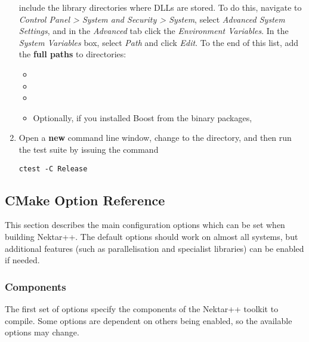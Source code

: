 \begin{enumerate}
  include the library directories where DLLs are stored. To do this, navigate to
  \emph{Control Panel > System and Security > System}, select \emph{Advanced
    System Settings}, and in the \emph{Advanced} tab click the \emph{Environment
    Variables}. In the \emph{System Variables} box, select \emph{Path} and click
  \emph{Edit}. To the end of this list, add the \textbf{full paths} to
  directories:
  \begin{itemize}
    \item {}
    \item {}
    \item {}
    \item Optionally, if you installed Boost from the binary packages,
  \end{itemize}
  \item Open a \textbf{new} command line window, change to the 
  directory, and then run the test suite by issuing the command
  \begin{lstlisting}[style=BashInputStyle]
    ctest -C Release
  \end{lstlisting}
\end{enumerate}

\subsection{CMake Option Reference}
\label{s:installation:source:cmake}
This section describes the main configuration options which can be set when
building Nektar++. The default options should work on almost all systems, but
additional features (such as parallelisation and specialist libraries) can be
enabled if needed.

\subsubsection{Components}
The first set of options specify the components of the Nektar++ toolkit to
compile. Some options are dependent on others being enabled, so the available
options may change.


